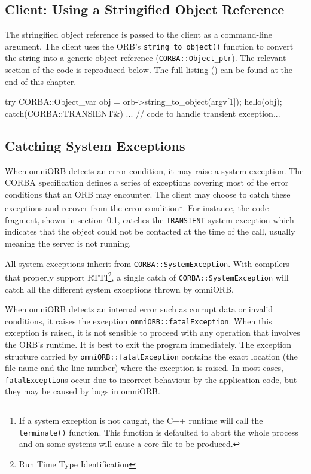 \documentclass[11pt,twoside,a4paper]{book}
\newcommand{\type}[1]{\texttt{#1}}
\newcommand{\code}[1]{\texttt{#1}}
\newcommand{\op}[1]{\texttt{#1()}}
\newcommand{\file}{\begingroup \urlstyle{tt}\Url}
\begin{document}
\subsection{Client: Using a Stringified Object Reference}
\label{clnt2}

The stringified object reference is passed to the client as a
command-line argument. The client uses the ORB's
\op{string\_to\_object} function to convert the string into a generic
object reference (\type{CORBA::Object\_ptr}). The relevant section of
the code is reproduced below. The full listing (\file{eg2_clt.cc}) can
be found at the end of this chapter.

\begin{cxxlisting}
try {
  CORBA::Object_var obj = orb->string_to_object(argv[1]);
  hello(obj);
}
catch(CORBA::TRANSIENT&) {
  ... // code to handle transient exception...
}
\end{cxxlisting}


\subsection{Catching System Exceptions}

When omniORB detects an error condition, it may raise a system
exception.  The CORBA specification defines a series of exceptions
covering most of the error conditions that an ORB may encounter. The
client may choose to catch these exceptions and recover from the error
condition\footnote{If a system exception is not caught, the C++
runtime will call the \op{terminate} function. This function is
defaulted to abort the whole process and on some systems will cause a
core file to be produced.}. For instance, the code fragment, shown in
section~\ref{clnt2}, catches the \code{TRANSIENT} system exception
which indicates that the object could not be contacted at the time of
the call, usually meaning the server is not running.

All system exceptions inherit from \type{CORBA::SystemException}. With
compilers that properly support RTTI\footnote{Run Time Type
Identification}, a single catch of \code{CORBA::SystemException} will
catch all the different system exceptions thrown by omniORB.

When omniORB detects an internal error such as corrupt data or invalid
conditions, it raises the exception \type{omniORB::fatalException}.
When this exception is raised, it is not sensible to proceed with any
operation that involves the ORB's runtime. It is best to exit the
program immediately. The exception structure carried by
\type{omniORB::fatalException} contains the exact location (the file
name and the line number) where the exception is raised. In most
cases, \type{fatalException}s occur due to incorrect behaviour by the
application code, but they may be caused by bugs in omniORB.
\end{document}
